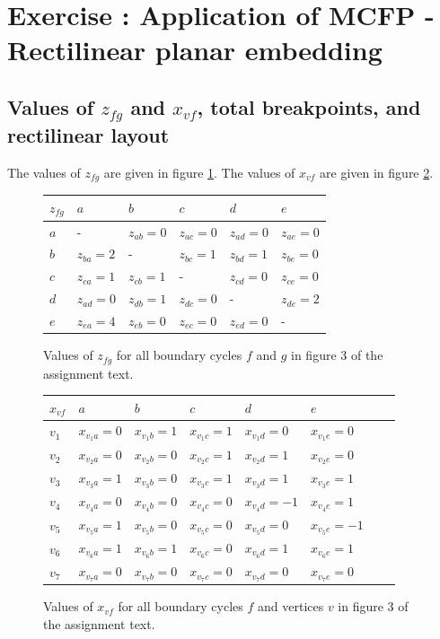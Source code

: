 \section{Exercise : Application of MCFP - Rectilinear planar embedding}

\subsection{Values of $z_{fg}$ and $x_{vf}$, total breakpoints, and rectilinear layout}

The values of $z_{fg}$ are given in figure \ref{fig:zfgtable}. The values of $x_{vf}$ are given in figure \ref{fig:xvftable}.

\begin{figure}
\centering
\begin{tabular}{l|lllll}
$z_{fg}$ & $a$ & $b$ & $c$ & $d$ & $e$  \\ \hline
$a$ & - & $z_{ab} = 0$ & $z_{ac} = 0$ & $z_{ad} = 0$ & $z_{ae} = 0$ \\
$b$ & $z_{ba} = 2$ & - & $z_{bc} = 1$ & $z_{bd} = 1$ & $z_{be} = 0$ \\
$c$ & $z_{ca} = 1$ & $z_{cb} = 1$ & - & $z_{cd} = 0$ & $z_{ce} = 0$ \\
$d$ & $z_{ad} = 0$ & $z_{db} = 1$ & $z_{dc} = 0$ & - & $z_{de} = 2$ \\
$e$ & $z_{ea} = 4$ & $z_{eb} = 0$ & $z_{ec} = 0$ & $z_{ed} = 0$ & - \\
\end{tabular}
\caption{\label{fig:zfgtable}Values of $z_{fg}$ for all boundary cycles $f$ and $g$ in figure 3 of the assignment text.}
\end{figure}

\begin{figure}
\centering
\begin{tabular}{l|lllllll}
$x_{vf}$ & $a$ & $b$ & $c$ & $d$ & $e$ \\ \hline
$v_1$ & $x_{v_1a} = 0 $ & $x_{v_1b} = 1 $ & $x_{v_1c} = 1 $ & $x_{v_1d} = 0 $ & $x_{v_1e} = 0 $ \\
$v_2$ & $x_{v_2a} = 0 $ & $x_{v_2b} = 0 $ & $x_{v_2c} = 1 $ & $x_{v_2d} = 1 $ & $x_{v_2e} = 0 $ \\
$v_3$ & $x_{v_3a} = 1 $ & $x_{v_3b} = 0 $ & $x_{v_3c} = 1 $ & $x_{v_3d} = 1 $ & $x_{v_3e} = 1 $ \\
$v_4$ & $x_{v_4a} = 0 $ & $x_{v_4b} = 0 $ & $x_{v_4c} = 0 $ & $x_{v_4d} = -1 $ & $x_{v_4e} = 1 $ \\
$v_5$ & $x_{v_5a} = 1 $ & $x_{v_5b} = 0 $ & $x_{v_5c} = 0 $ & $x_{v_5d} = 0 $ & $x_{v_5e} = -1 $ \\
$v_6$ & $x_{v_6a} = 1 $ & $x_{v_6b} = 1 $ & $x_{v_6c} = 0 $ & $x_{v_6d} = 1 $ & $x_{v_6e} = 1 $ \\
$v_7$ & $x_{v_7a} = 0 $ & $x_{v_7b} = 0 $ & $x_{v_7c} = 0 $ & $x_{v_7d} = 0 $ & $x_{v_7e} = 0 $ \\
\end{tabular}
\caption{\label{fig:xvftable}Values of $x_{vf}$ for all boundary cycles $f$ and vertices $v$ in figure 3 of the assignment text.}
\end{figure}

